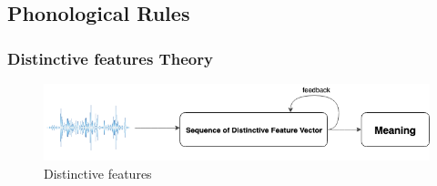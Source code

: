 \documentclass[12pt]{book}
\begin{document}
\subsection{Phonological Rules}
\subsubsection{Distinctive features Theory}
\begin{figure}[ht]
	\centering
	\includegraphics[scale=0.65]{Figure/Figure14_2.png}
	\caption{Distinctive features}
\end{figure}
\end{document}
